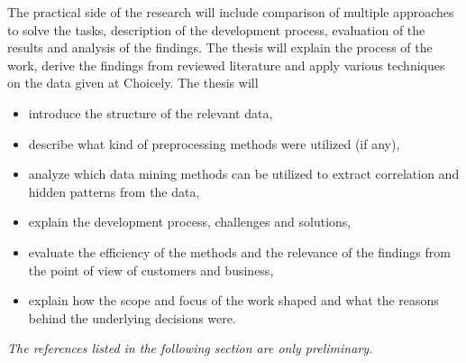 \documentclass[english]{tktltiki}
\begin{document}
	\pagebreak
	The practical side of the research will include comparison of multiple approaches to solve the tasks, description of the development process, evaluation of the results and analysis of the findings. The thesis will explain the process of the work, derive the findings from reviewed literature and apply various techniques on the data given at Choicely. The thesis will  

\begin{itemize}
    \item introduce the structure of the relevant data,
    \item describe what kind of preprocessing methods were utilized (if any),
    \item analyze which data mining methods can be utilized to extract correlation and hidden patterns from the data, 
    \item explain the development process, challenges and solutions,
    \item evaluate the efficiency of the methods and the relevance of the findings from the point of view of customers and business, 
    \item explain how the scope and focus of the work shaped and what the reasons behind the underlying decisions were.
\end{itemize}

\textit{The references listed in the following section are only preliminary.}
    
\nocite{*}



\lastpage

\appendices

\pagestyle{empty}

%
%
\end{document}
